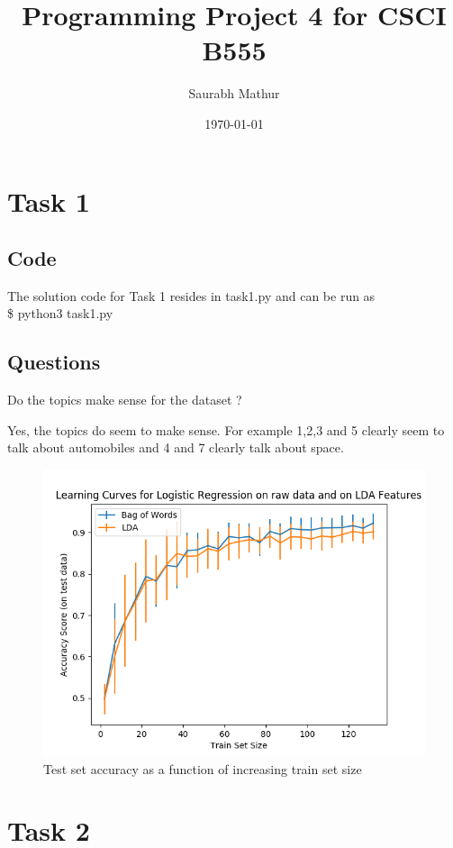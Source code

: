 \documentclass[11pt, letterpaper, fleqn]{article}
\title{\textbf{Programming Project 4 for CSCI B555}}
\author{Saurabh Mathur}
\date{\today}
\begin{document}
\maketitle

\section*{Task 1}

\subsection*{Code}
The solution code for Task 1 resides in task1.py and can be run as \\

\$ python3 task1.py


\subsection*{Questions}
Do the topics make sense for the dataset ?

Yes, the topics do seem to make sense. For example 1,2,3 and 5 clearly seem to talk about automobiles and 4 and 7 clearly talk about space.


\begin{figure}
\includegraphics[width=\textwidth]{Figure_1.png}
\caption{Test set accuracy as a function of increasing train set size}
\label{fig:1a}
\end{figure}


\section*{Task 2}
\end{document}
